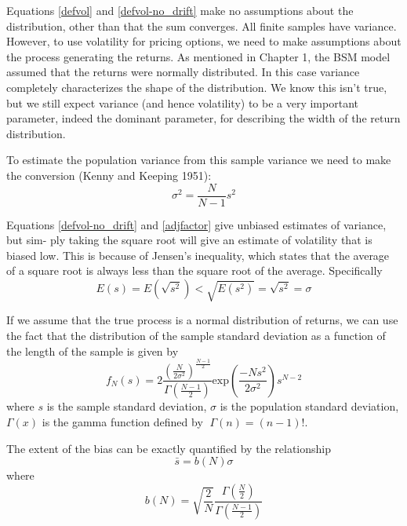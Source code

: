 \documentclass[11pt]{report}
\begin{document}
		Equations \eqref{defvol} and \eqref{defvol-no_drift} make no assumptions about the distribution, other than that the sum converges. All finite samples have variance. However, to use volatility for pricing options, we need to make assumptions about the process generating the returns. As mentioned in Chapter 1, the BSM model assumed that the returns were normally distributed. In this case variance completely characterizes the shape of the distribution. We know this isn't true, but we still expect variance (and hence volatility) to be a very important parameter, indeed the dominant parameter, for describing the width of the return distribution.

		To estimate the population variance from this sample variance we need to make the conversion (Kenny and Keeping 1951):
		\begin{equation}
			\sigma^2 = \frac{N}{N-1} s^2
			\label{adjfactor}
		\end{equation}

		Equations \eqref{defvol-no_drift} and \eqref{adjfactor} give unbiased estimates of variance, but sim- ply taking the square root will give an estimate of volatility that is biased low. This is because of Jensen's inequality, which states that the average of a square root is always less than the square root of the average. Specifically 
		\begin{equation}
			E(s) = E(\sqrt{s^2}) < \sqrt{E(s^2)} = \sqrt{s^2}= \sigma
		\end{equation}

		If we assume that the true process is a normal distribution of returns, we can use the fact that the distribution of the sample standard deviation as a function of the length of the sample is given by
		\begin{equation}
			f_N(s) = 2 \frac{\left(\frac{N}{2 \sigma^2}\right)^\frac{N-1}{2}}{\Gamma \left(\frac{N-1}{2}\right)} \text{exp}\left(\frac{-N s^2}{2 \sigma^2}\right) s^{N-2}
		\end{equation}
		where $s$ is the sample standard deviation, $\sigma$ is the population standard deviation, $\Gamma(x)$ is the gamma function defined by 􏰙$\Gamma(n) = (n - 1)!$.

		The extent of the bias can be exactly quantified by the relationship
		\begin{equation}
			\bar{s} = b(N)\sigma
		\end{equation}
		where
		\begin{equation}
			b(N) = \sqrt{\frac{2}{N}} \frac{\Gamma \left(\frac{N}{2}\right)}{\Gamma \left(\frac{N - 1}{2}\right)}
			\label{2.adjfactor}
		\end{equation}
\end{document}
